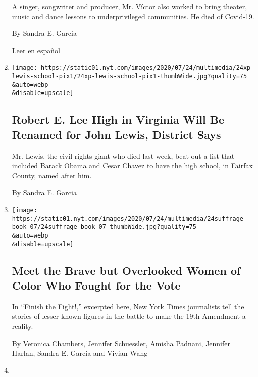 \begin{enumerate}
  A singer, songwriter and producer, Mr. Víctor also worked to bring
  theater, music and dance lessons to underprivileged communities. He
  died of Covid-19.

  By Sandra E. Garcia

  \href{https://www.nytimes.com/es/2020/08/03/espanol/cultura/victor-victor-murio-coronavirus.html}{Leer
  en español}
\item
  \href{/2020/07/24/us/robert-e-lee-high-school-john-lewis.html}{}

  \texttt{[image: https://static01.nyt.com/images/2020/07/24/multimedia/24xp-lewis-school-pix1/24xp-lewis-school-pix1-thumbWide.jpg?quality=75\\\&auto=webp\\\&disable=upscale]}

  \hypertarget{robert-e-lee-high-in-virginia-will-be-renamed-for-john-lewis-district-says}{%
  \subsection{Robert E. Lee High in Virginia Will Be Renamed for John
  Lewis, District
  Says}\label{robert-e-lee-high-in-virginia-will-be-renamed-for-john-lewis-district-says}}

  Mr. Lewis, the civil rights giant who died last week, beat out a list
  that included Barack Obama and Cesar Chavez to have the high school,
  in Fairfax County, named after him.

  By Sandra E. Garcia
\item
  \href{/2020/07/24/books/finish-the-fight-excerpt.html}{}

  \texttt{[image: https://static01.nyt.com/images/2020/07/24/multimedia/24suffrage-book-07/24suffrage-book-07-thumbWide.jpg?quality=75\\\&auto=webp\\\&disable=upscale]}

  \hypertarget{meet-the-brave-but-overlooked-women-of-color-who-fought-for-the-vote}{%
  \subsection{Meet the Brave but Overlooked Women of Color Who Fought
  for the
  Vote}\label{meet-the-brave-but-overlooked-women-of-color-who-fought-for-the-vote}}

  In ``Finish the Fight!,'' excerpted here, New York Times journalists
  tell the stories of lesser-known figures in the battle to make the
  19th Amendment a reality.

  By Veronica Chambers, Jennifer Schuessler, Amisha Padnani, Jennifer
  Harlan, Sandra E. Garcia and Vivian Wang
\item
  \href{/2020/07/21/us/politics/john-lewis-comic-con.html}{}


\end{enumerate}
